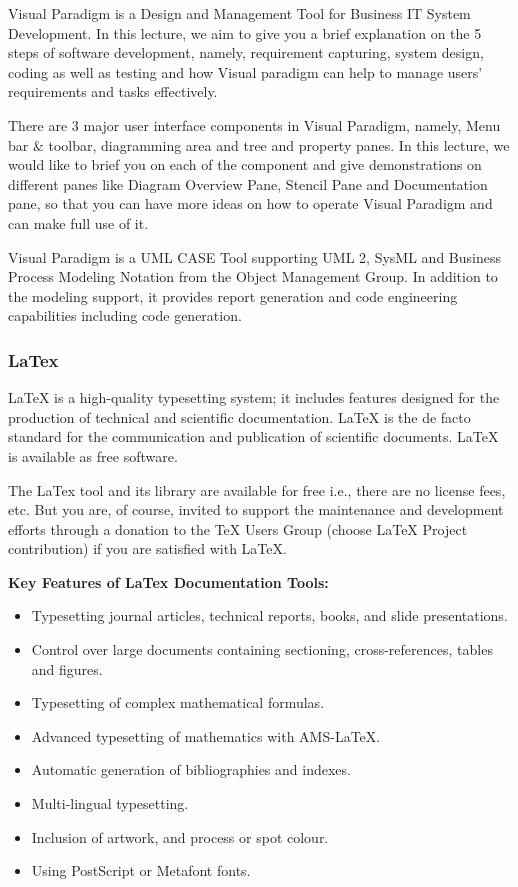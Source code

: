\documentclass[12pt, a4paper]{report}
\begin{document}
Visual Paradigm is a Design and Management Tool for Business IT System Development. In this lecture, we aim to give you a brief explanation on the 5 steps of software development, namely, requirement capturing, system design, coding as well as testing and how Visual paradigm can help to manage users’ requirements and tasks effectively.

There are 3 major user interface components in Visual Paradigm, namely, Menu bar \& toolbar, diagramming area and tree and property panes. In this lecture, we would like to brief you on each of the component and give demonstrations on different panes like Diagram Overview Pane, Stencil Pane and Documentation pane, so that you can have more ideas on how to operate Visual Paradigm and can make full use of it.

Visual Paradigm is a UML CASE Tool supporting UML 2, SysML and Business Process Modeling Notation from the Object Management Group. In addition to the modeling support, it provides report generation and code engineering capabilities including code generation.


\subsubsection{LaTex}

LaTeX is a high-quality typesetting system; it includes features designed for the production of technical and scientific documentation. LaTeX is the de facto standard for the communication and publication of scientific documents. LaTeX is available as free software.

The LaTex tool and its library are available for free i.e., there are no license fees, etc. But you are, of course, invited to support the maintenance and development efforts through a donation to the TeX Users Group (choose LaTeX Project contribution) if you are satisfied with LaTeX.


\textbf{Key Features of LaTex Documentation Tools:}
\begin{itemize}
	\item Typesetting journal articles, technical reports, books, and slide presentations.
	\item Control over large documents containing sectioning, cross-references, tables and figures.
	\item Typesetting of complex mathematical formulas.
	\item Advanced typesetting of mathematics with AMS-LaTeX.
	\item Automatic generation of bibliographies and indexes.
	\item Multi-lingual typesetting.
	\item Inclusion of artwork, and process or spot colour.
	\item Using PostScript or Metafont fonts.
\end{itemize}
\end{document}
